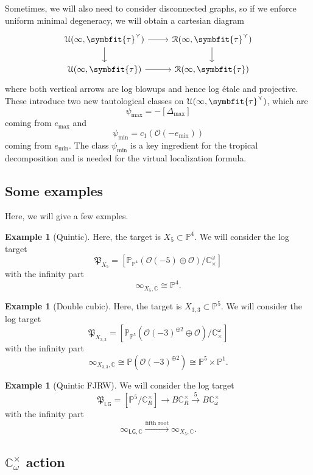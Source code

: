 \documentclass[10pt,oldfontcommands,oneside]{memoir}
\theoremstyle{definition}
\newtheorem{exm}[thm]{Example}
\theoremstyle{remark}
\theoremstyle{plain}
\theoremstyle{definition}
\theoremstyle{remark}
\newcommand{\C}{\mathbb{C}}
\renewcommand{\P}{\mathbb{P}}
\newcommand{\mc}[1]{\mathcal{#1}}
\newcommand{\mf}[1]{\mathfrak{#1}}
\newcommand{\btau}{\symbfit{\tau}}
\newcommand{\ms}[1]{\mathsf{#1}}
\newcommand{\1}{\mathbf{1}}
\newcommand{\2}{\mathbf{2}}
\newcommand{\3}{\mathbf{3}}
\newcommand{\LG}{\ms{LG}}
\begin{document}
Sometimes, we will also need to consider disconnected graphs, so if we enforce uniform minimal degeneracy, we will obtain a cartesian diagram
\begin{equation*}
\begin{tikzcd}
    \mc{U}(\infty, \btau^{\curlyvee}) \ar{r} \ar{d} & \mc{R}(\infty, \btau^{\curlyvee}) \ar{d} \\
    \mc{U}(\infty, \btau) \ar{r} & \mc{R}(\infty, \btau)  
\end{tikzcd}
\end{equation*}
where both vertical arrows are log blowups and hence log \'etale and projective. These introduce two new tautological classes on $\mc{U}(\infty, \btau^{\curlyvee})$, which are
\[ \psi_{\max} = -[\Delta_{\max}] \]
coming from $e_{\max}$ and
\[ \psi_{\min}= c_1(\mc{O}(-e_{\min})) \]
coming from $e_{\min}$. The class $\psi_{\min}$ is a key ingredient for the tropical decomposition and is needed for the virtual localization formula.

\subsection{Some examples}%
\label{sub:Some examples}

Here, we will give a few exmples.
\begin{exm}[Quintic]
    Here, the target is $X_5 \subset \P^4$. We will consider the log target
    \[ \mf{P}_{X_5} = [\P_{\P^4}(\mc{O}(-5) \oplus \mc{O})/\C_{\times}^{\omega}] \]
    with the infinity part
    \[ \infty_{X_5,\C} \cong \P^4. \]
\end{exm}

\begin{exm}[Double cubic]
    Here, the target is $X_{3,3} \subset \P^5$. We will consider the log target
    \[ \mf{P}_{X_{3,3}} = [\P_{\P^5}(\mc{O}(-3)^{\oplus 2} \oplus \mc{O})/\C_{\times}^{\omega}] \]
    with the infinity part
    \[ \infty_{X_{3,3},\C} \cong \P(\mc{O}(-3)^{\oplus 2}) \cong \P^5 \times \P^1. \]
\end{exm}

\begin{exm}[Quintic FJRW]
     We will consider the log target
    \[ \mf{P}_{\LG} = [\P^5 / \C_R^{\times}] \to B \C_R^{\times} \xrightarrow{5} B\C_{\omega}^{\times} \]
    with the infinity part
    \[ \infty_{\LG, \C} \xrightarrow{\text{fifth root}} \infty_{X_5, \C}. \]
\end{exm}

\subsection{\texorpdfstring{$\C^{\times}_{\omega}$ action}{C star action}}%
\label{sub:action}
\end{document}
